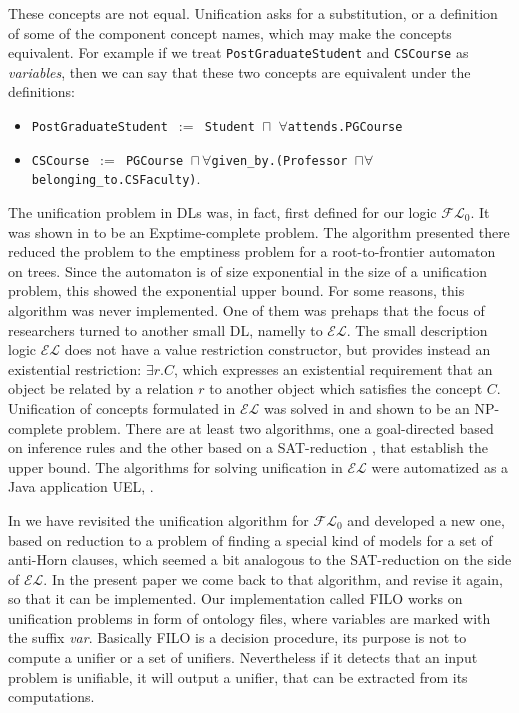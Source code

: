 \documentclass{article}
\newcommand{\el}{\ensuremath{\mathcal{EL}}\xspace}
\newcommand{\flo}{\ensuremath{\mathcal{FL}_0}\xspace}
\begin{document}
	These concepts are not equal. Unification asks for a substitution, or a definition of some of the component concept names, which
	may make the concepts equivalent. For example if we treat \texttt{PostGraduateStudent} and \texttt{CSCourse} as \emph{variables},
	then we can say that these two concepts are equivalent under the definitions:
	
	\begin{itemize}
		\item \texttt{PostGraduateStudent $:=$ Student $\sqcap$ $\forall${attends}.PGCourse} 
		\item \texttt{CSCourse $:=$ PGCourse $\sqcap\, \forall$given\_by.(Professor $\sqcap \forall$belonging\_to.CSFaculty)}.
	\end{itemize}
	
	
	The unification problem in DLs was, in fact, first defined for our logic \flo. It was shown in \cite{BaNa-JSC01} to be
	an Exptime-complete problem. The algorithm presented there reduced the problem to the emptiness problem for
	a root-to-frontier automaton on trees. Since the automaton is of size exponential in the size of
	a unification problem, this showed the exponential upper bound. For some reasons, this algorithm
	was never implemented. One of them was prehaps that the focus of researchers turned to another
	small DL, namelly to \el. The small description logic \el does not have a value restriction constructor,
	but provides instead an existential restriction: $\exists r.C$, which expresses an existential requirement
	that an object be related by a relation $r$ to another object which satisfies the concept $C$.
	Unification of concepts formulated in \el was solved in \cite{Baader2010} and 
	shown to be an NP-complete problem. There are at least two algorithms, one a goal-directed based on inference rules\cite{Baader2012c} and the other based on a SAT-reduction \cite{Baader2012a}, that establish the upper bound.
	The algorithms for solving unification in \el were automatized as a Java application UEL, \cite{Baader2012b}.
	
	In \cite{Borgwardt2012} we have revisited the unification algorithm for \flo and 
	developed a new one, based on reduction to a problem of finding a special kind of models for 
	a set of anti-Horn clauses, which seemed a bit analogous to the SAT-reduction on the side of \el.
	In the present paper we come back to that algorithm, and revise it again, so that it can be 
	implemented. Our implementation called FILO works on unification problems in form of ontology files,
	where variables are marked with the suffix \emph{var}. Basically FILO is a decision procedure,
	its purpose is not to compute a  unifier or a set of unifiers. Nevertheless if it detects that
	an input problem is unifiable, it will output a unifier, that can be extracted from its computations.
	
\end{document}
